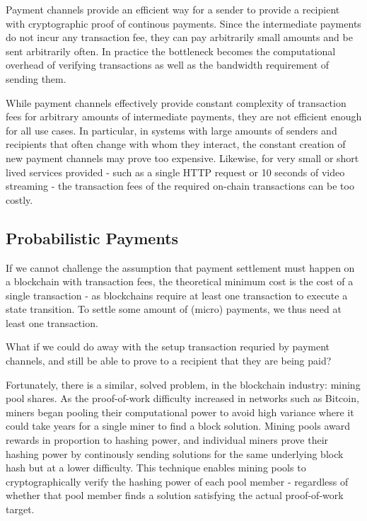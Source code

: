 Payment channels provide an efficient way for a sender to provide a recipient with cryptographic proof of continous payments. Since the intermediate payments do not incur any transaction fee, they can pay arbitrarily small amounts and be sent arbitrarily often. In practice the bottleneck becomes the computational overhead of verifying transactions as well as the bandwidth requirement of sending them.

While payment channels effectively provide constant complexity of transaction fees for arbitrary amounts of intermediate payments, they are not efficient enough for all use cases. In particular, in systems  with large amounts of senders and recipients that often change with whom they interact, the constant creation of new payment channels may prove too expensive. Likewise, for very small or short lived services provided - such as a single HTTP request or 10 seconds of video streaming - the transaction fees of the required on-chain transactions can be too costly.

\subsection{Probabilistic Payments}

If we cannot challenge the assumption that payment settlement must happen on a blockchain with transaction fees, the theoretical minimum cost is the cost of a single transaction - as blockchains require at least one transaction to execute a state transition. To settle some amount of (micro) payments, we thus need at least one transaction.

What if we could do away with the setup transaction requried by payment channels, and still be able to prove to a recipient that they are being paid?

Fortunately, there is a similar, solved problem, in the blockchain industry: mining pool shares\cite{MiningPoolMethods}. As the proof-of-work difficulty increased in networks such as Bitcoin, miners began pooling their computational power to avoid high variance where it could take years for a single miner to find a block solution. Mining pools award rewards in proportion to hashing power, and individual miners prove their hashing power by continously sending solutions\cite{MiningPoolShares} for the same underlying block hash but at a lower difficulty. This technique enables mining pools to cryptographically verify the hashing power of each pool member - regardless of whether that pool member finds a solution satisfying the actual proof-of-work target.

